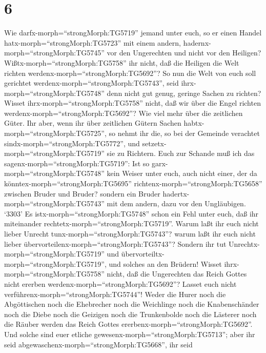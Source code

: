 \hypertarget{section-5}{%
\section{6}\label{section-5}}

 Wie darfx-morph=``strongMorph:TG5719'' jemand unter euch,
so er einen Handel hatx-morph=``strongMorph:TG5723'' mit einem andern,
hadernx-morph=``strongMorph:TG5745'' vor den Ungerechten und nicht vor
den Heiligen?  Wißtx-morph=``strongMorph:TG5758'' ihr nicht,
daß die Heiligen die Welt richten werdenx-morph=``strongMorph:TG5692''?
So nun die Welt von euch soll gerichtet
werdenx-morph=``strongMorph:TG5743'', seid
ihrx-morph=``strongMorph:TG5748'' denn nicht gut genug, geringe Sachen
zu richten?  Wisset ihrx-morph=``strongMorph:TG5758'' nicht,
daß wir über die Engel richten werdenx-morph=``strongMorph:TG5692''? Wie
viel mehr über die zeitlichen Güter.  Ihr aber, wenn ihr
über zeitlichen Gütern Sachen habtx-morph=``strongMorph:TG5725'', so
nehmt ihr die, so bei der Gemeinde verachtet
sindx-morph=``strongMorph:TG5772'', und
setzetx-morph=``strongMorph:TG5719'' sie zu Richtern.  Euch
zur Schande muß ich das sagenx-morph=``strongMorph:TG5719'': Ist so
garx-morph=``strongMorph:TG5748'' kein Weiser unter euch, auch nicht
einer, der da könntex-morph=``strongMorph:TG5695''
richtenx-morph=``strongMorph:TG5658'' zwischen Bruder und Bruder?
 sondern ein Bruder hadertx-morph=``strongMorph:TG5743'' mit
dem andern, dazu vor den Ungläubigen.  `3303' Es
istx-morph=``strongMorph:TG5748'' schon ein Fehl unter euch, daß ihr
miteinander rechtetx-morph=``strongMorph:TG5719''. Warum laßt ihr euch
nicht lieber Unrecht tunx-morph=``strongMorph:TG5743''? warum laßt ihr
euch nicht lieber übervorteilenx-morph=``strongMorph:TG5743''?
 Sondern ihr tut Unrechtx-morph=``strongMorph:TG5719'' und
übervorteiltx-morph=``strongMorph:TG5719'', und solches an den Brüdern!
 Wisset ihrx-morph=``strongMorph:TG5758'' nicht, daß die
Ungerechten das Reich Gottes nicht ererben
werdenx-morph=``strongMorph:TG5692''? Lasset euch nicht
verführenx-morph=``strongMorph:TG5744''! Weder die Hurer noch die
Abgöttischen noch die Ehebrecher noch die Weichlinge noch die
Knabenschänder  noch die Diebe noch die Geizigen noch die
Trunkenbolde noch die Lästerer noch die Räuber werden das Reich Gottes
ererbenx-morph=``strongMorph:TG5692''.  Und solche sind
euer etliche gewesenx-morph=``strongMorph:TG5713''; aber ihr seid
abgewaschenx-morph=``strongMorph:TG5668'', ihr seid
